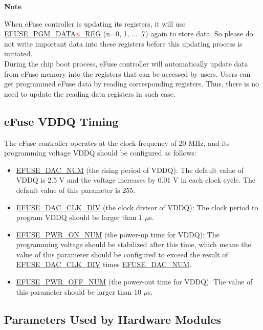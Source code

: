\documentclass[main\_\_EN.tex]{subfiles}
\begin{document}
{\bfseries Note}

When eFuse controller is updating its registers, it will use \hyperref[regdesc:EFUSEPGMDATANREG]{EFUSE\_PGM\_DATA\textcolor{red}{\it{n}}\_REG} (n=0, 1, ... ,7) again to store data. So please do not write important data into these registers before this updating process is initiated. \\
During the chip boot process, eFuse controller will automatically update data from eFuse memory into the registers that can be accessed by users. Users can get programmed eFuse data by reading corresponding registers. Thus, there is no need to update the reading data registers in such case.

\subsection{eFuse VDDQ Timing}
\label{sec:efuse-vddq-timing}

The eFuse controller operates at the clock frequency of 20 MHz, and its programming voltage VDDQ should be configured as follows:

\begin{itemize}
    \item \hyperref[fielddesc:EFUSEDACNUM]{EFUSE\_DAC\_NUM} (the rising period of VDDQ): The default value of VDDQ is 2.5 V and the voltage increases by 0.01 V in each clock cycle. The default value of this parameter is 255.
    \item \hyperref[fielddesc:EFUSEDACCLKDIV]{EFUSE\_DAC\_CLK\_DIV} (the clock divisor of VDDQ): The clock period to program VDDQ should be larger than 1 $\mu$s.
    \item \hyperref[fielddesc:EFUSEPWRONNUM]{EFUSE\_PWR\_ON\_NUM} (the power-up time for VDDQ): The programming voltage should be stabilized after this time, which means the value of this parameter should be configured to exceed the result of \hyperref[fielddesc:EFUSEDACCLKDIV]{EFUSE\_DAC\_CLK\_DIV} times \hyperref[fielddesc:EFUSEDACNUM]{EFUSE\_DAC\_NUM}.
    \item \hyperref[fielddesc:EFUSEPWROFFNUM]{EFUSE\_PWR\_OFF\_NUM} (the power-out time for VDDQ): The value of this parameter should be larger than 10 $\mu$s.
\end{itemize}



\subsection{Parameters Used by Hardware Modules}
\end{document}

